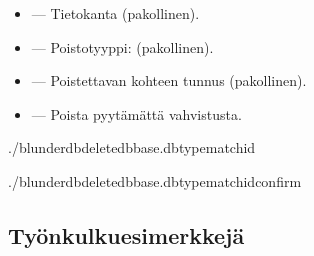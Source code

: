 \documentclass[letterpaper,10pt,finnish]{sphinxmanual}
\begin{document}
\sphinxAtStartPar
{}
\begin{itemize}
\item {} 
\sphinxAtStartPar
{} — Tietokanta (pakollinen).

\item {} 
\sphinxAtStartPar
{} — Poistotyyppi:  (pakollinen).

\item {} 
\sphinxAtStartPar
{} — Poistettavan kohteen tunnus (pakollinen).

\item {} 
\sphinxAtStartPar
{} — Poista pyytämättä vahvistusta.

\end{itemize}

\sphinxAtStartPar
{}

\begin{sphinxVerbatim}[commandchars=\\\{\}]
./blunderdbdelete\PYGZhy{}\PYGZhy{}dbbase.db\PYGZhy{}\PYGZhy{}typematch\PYGZhy{}\PYGZhy{}id

./blunderdbdelete\PYGZhy{}\PYGZhy{}dbbase.db\PYGZhy{}\PYGZhy{}typematch\PYGZhy{}\PYGZhy{}id\PYGZhy{}\PYGZhy{}confirm
\end{sphinxVerbatim}


\subsection{Työnkulkuesimerkkejä}
\label{\detokenize{cli:exemples-de-flux-de-travail}}
\end{document}
